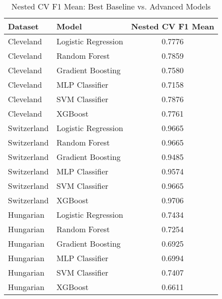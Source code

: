 \documentclass{article}
\begin{document}
\begin{table}[htbp]
\centering
\caption{Nested CV F1 Mean: Best Baseline vs. Advanced Models}
\label{tab:advanced_comparison_nested}
\begin{tabular}{llc}
\toprule
Dataset     & Model                & Nested CV F1 Mean \\
\midrule
Cleveland   & Logistic Regression  & 0.7776    \\
Cleveland   & Random Forest        & 0.7859    \\
Cleveland   & Gradient Boosting    & 0.7580    \\
Cleveland   & MLP Classifier       & 0.7158    \\
Cleveland   & SVM Classifier       & 0.7876    \\
Cleveland   & XGBoost              & 0.7761    \\
\midrule
Switzerland & Logistic Regression  & 0.9665    \\
Switzerland & Random Forest        & 0.9665    \\
Switzerland & Gradient Boosting    & 0.9485    \\
Switzerland & MLP Classifier       & 0.9574    \\
Switzerland & SVM Classifier       & 0.9665    \\
Switzerland & XGBoost              & 0.9706    \\
\midrule
Hungarian   & Logistic Regression  & 0.7434    \\
Hungarian   & Random Forest        & 0.7254    \\
Hungarian   & Gradient Boosting    & 0.6925    \\
Hungarian   & MLP Classifier       & 0.6994    \\
Hungarian   & SVM Classifier       & 0.7407    \\
Hungarian   & XGBoost              & 0.6611    \\
\bottomrule
\end{tabular}
\end{table}
\end{document}
